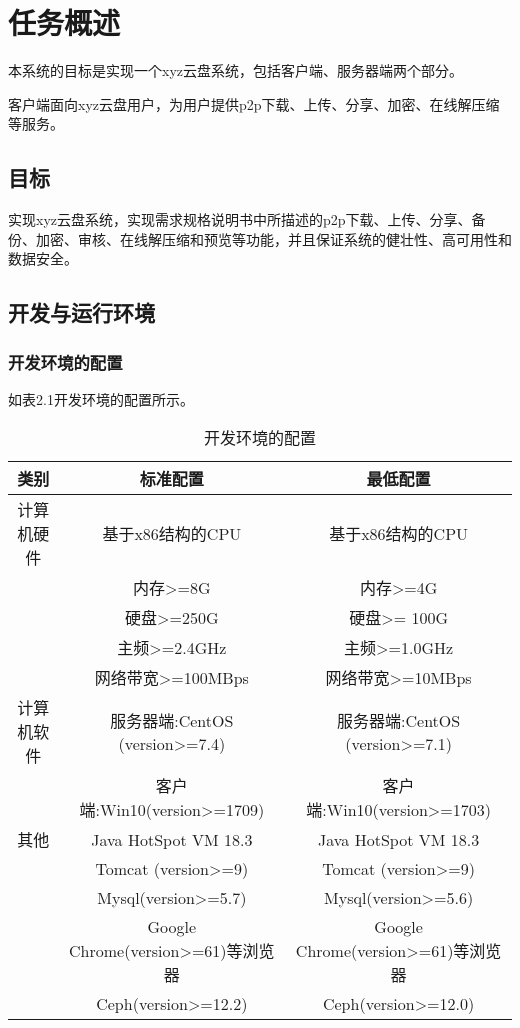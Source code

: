\chapter{任务概述}
本系统的目标是实现一个xyz云盘系统，包括客户端、服务器端两个部分。

客户端面向xyz云盘用户，为用户提供p2p下载、上传、分享、加密、在线解压缩等服务。

\section{目标}
实现xyz云盘系统，实现需求规格说明书中所描述的p2p下载、上传、分享、备份、加密、审核、在线解压缩和预览等功能，并且保证系统的健壮性、高可用性和数据安全。

\section{开发与运行环境}

\subsection{开发环境的配置}
如表2.1开发环境的配置所示。
\begin{table}[htbp]
\centering
\caption{开发环境的配置} \label{tab:development-environment}
\begin{tabular}{|c|c|c|}
    \hline
    类别 & 标准配置 & 最低配置 \\
    \hline
    计算机硬件 & 基于x86结构的CPU & 基于x86结构的CPU \\ 
             & 内存>=8G & 内存>=4G \\
             & 硬盘>=250G & 硬盘>= 100G \\
             & 主频>=2.4GHz & 主频>=1.0GHz \\
             & 网络带宽>=100MBps & 网络带宽>=10MBps \\ 
    \hline
    计算机软件 & 服务器端:CentOS (version>=7.4) & 服务器端:CentOS (version>=7.1)\\
             & 客户端:Win10(version>=1709) & 客户端:Win10(version>=1703)\\
    \hline
    其他 & Java HotSpot VM 18.3 &  Java HotSpot VM 18.3\\
        & Tomcat (version>=9) &  Tomcat (version>=9)\\ 
        & Mysql(version>=5.7) &  Mysql(version>=5.6)\\
        & Google Chrome(version>=61)等浏览器 &  Google Chrome(version>=61)等浏览器\\
        & Ceph(version>=12.2) &  Ceph(version>=12.0)\\
    \hline
\end{tabular}
\end{table}

